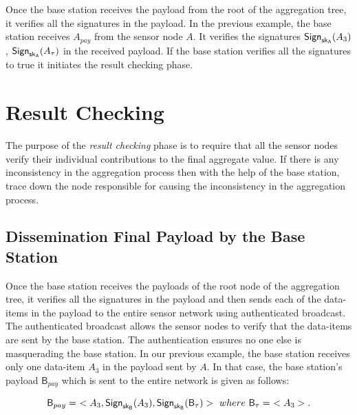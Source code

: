 	Once the base station receives the payload from the root of the aggregation tree, it verifies all the signatures in the payload.
	In the previous example, the base station receives $A_{pay}$ from the sensor node $A$.
	It verifies the signatures $\textsf{Sign}_{\sf{sk}_{A}}(A_{3})$, $\textsf{Sign}_{\sf{sk}_{A}}(A_{\tau})$ in the received payload.	 
	If the base station verifies all the signatures to true it initiates the result checking phase.

\section{Result Checking}
	The purpose of the \textit{result checking} phase is to require that all the sensor nodes verify their individual contributions to the final aggregate value.
	If there is any inconsistency in the aggregation process then with the help of the base station, trace down the node responsible for causing the inconsistency in the aggregation process.

	\subsection{Dissemination Final Payload by the Base Station}
		Once the base station receives the payloads of the root node of the aggregation tree, it verifies all the signatures in the payload and then sends each of the data-items in the payload to the entire sensor network using authenticated broadcast.
		The authenticated broadcast allows the sensor nodes to verify that the data-items are sent by the base station. 
		The authentication ensures no one else is masquerading the base station.
		In our previous example, the base station receives only one data-item $A_{3}$ in the payload sent by $A$.
		In that case, the base station's payload $\textsf{B}_{pay}$ which is sent to the entire network is given as follows:
		
	 		\begin{equation*}
				\textsf{B}_{pay} =\ <A_{3}, \textsf{Sign}_{\sk_{\textsf{B}}}(A_{3}), \textsf{Sign}_{\sk_{\textsf{B}}}(\textsf{B}_{\tau})>\ where\ \textsf{B}_{\tau} =\ <A_{3}>.
			\end{equation*}
		

